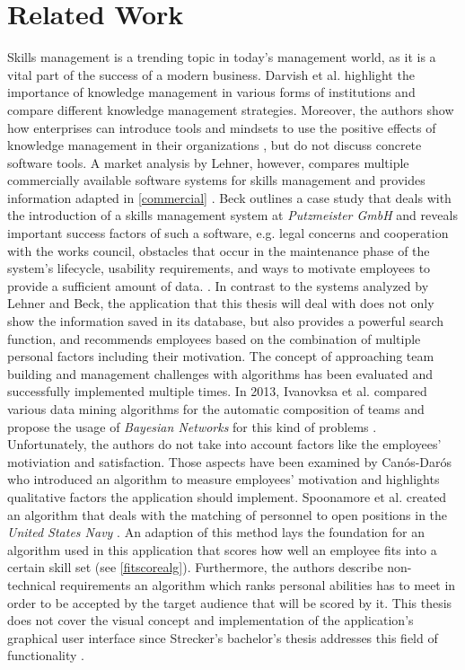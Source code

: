 \chapter{Related Work}

Skills management is a trending topic in today's management world, as it is a vital part of the success of a modern business.
Darvish et al. highlight the importance of knowledge management in various forms of institutions and compare different knowledge management strategies.
Moreover, the authors show how enterprises can introduce tools and mindsets to use the positive effects of knowledge management in their organizations \cite{darvish}, but do not discuss concrete software tools.
A market analysis by Lehner, however, compares multiple commercially available software systems for skills management and provides information adapted in \ref{commercial}  \cite{Marktanalyse}.
\newline
Beck outlines a case study that deals with the introduction of a skills management system at \textit{Putzmeister GmbH} and reveals important success factors of such a software, e.g. legal concerns and cooperation with the works council, obstacles that occur in the maintenance phase of the system's lifecycle, usability requirements, and ways to motivate employees to provide a sufficient amount of data. \cite{beck}.
\newline
In contrast to the systems analyzed by Lehner and Beck, the application that this thesis will deal with does not only
show the information saved in its database, but also provides a powerful search function, and recommends employees based on the combination of multiple personal factors including their motivation.
\newline
The concept of approaching team building and management challenges with algorithms has been evaluated and successfully implemented multiple times.
In 2013, Ivanovksa et al. compared various data mining algorithms for the automatic composition of teams and propose the usage of \textit{Bayesian Networks} for this kind of problems \cite{ivanovska}. Unfortunately, the authors do not take into account factors like the employees' motiviation and satisfaction. Those aspects have been examined by Canós-Darós who introduced an algorithm to measure employees' motivation \cite{CanosDaros2013} and highlights qualitative factors the application should implement.
Spoonamore et al. created an algorithm that deals with the matching of personnel to open positions in the \textit{United States Navy} \cite{USN}. An adaption of this method lays the foundation for an algorithm used in this application that scores how well an employee fits into a certain skill set (see \ref{fitscorealg}). Furthermore, the authors describe non-technical requirements an algorithm which ranks personal abilities has to
meet in order to be accepted by the target audience that will be scored by it.
\newline
This thesis does not cover the visual concept and implementation of the application's graphical user interface since
Strecker's bachelor's thesis addresses this field of functionality \cite{strecker}.
